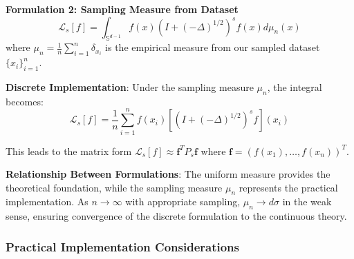 \documentclass[a4paper]{article}
\begin{document}
\textbf{Formulation 2: Sampling Measure from Dataset}
\[ \mathcal{L}_s[f] = \int_{\mathbb{S}^{d-1}} f(x) (I + (-\Delta)^{1/2})^s f(x) d\mu_n(x) \]
where $\mu_n = \frac{1}{n}\sum_{i=1}^n \delta_{x_i}$ is the empirical measure from our sampled dataset $\{x_i\}_{i=1}^n$.

\textbf{Discrete Implementation}:
Under the sampling measure $\mu_n$, the integral becomes:
\[ \mathcal{L}_s[f] = \frac{1}{n}\sum_{i=1}^n f(x_i) \left[(I + (-\Delta)^{1/2})^s f\right](x_i) \]

This leads to the matrix form $\mathcal{L}_s[f] \approx \mathbf{f}^T P_s \mathbf{f}$ where $\mathbf{f} = (f(x_1), \ldots, f(x_n))^T$.

\textbf{Relationship Between Formulations}:
The uniform measure provides the theoretical foundation, while the sampling measure $\mu_n$ represents the practical implementation. As $n \to \infty$ with appropriate sampling, $\mu_n \to d\sigma$ in the weak sense, ensuring convergence of the discrete formulation to the continuous theory.

\subsubsection{Practical Implementation Considerations}
\end{document}
